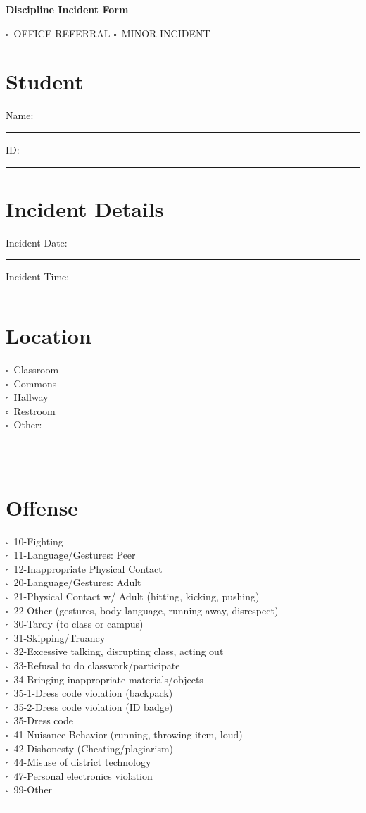 \documentclass[12pt]{article}
\def\sq{$\square$\ }
\begin{document}
\begin{center}
    \textbf{Discipline Incident Form}
\end{center}

\sq OFFICE REFERRAL \hspace{2em} \sq MINOR INCIDENT

\section*{Student}

Name: \rule{6cm}{0.15mm} \hfill ID: \rule{4cm}{0.15mm}

\section*{Incident Details}

Incident Date: \rule{4cm}{0.15mm} \hfill Incident Time: \rule{4cm}{0.15mm}

\section*{Location}

\sq Classroom\\
\sq Commons\\
\sq Hallway\\
\sq Restroom\\
\sq Other: \rule{4cm}{0.15mm}\\

\section*{Offense}
\begin{multicols}{2}
\sq 10-Fighting\\
\sq 11-Language/Gestures: Peer\\
\sq 12-Inappropriate Physical Contact\\
\sq 20-Language/Gestures: Adult\\
\sq 21-Physical Contact w/ Adult (hitting, kicking, pushing)\\
\sq 22-Other (gestures, body language, running away, disrespect)\\
\sq 30-Tardy (to class or campus)\\
\sq 31-Skipping/Truancy\\
\sq 32-Excessive talking, disrupting class, acting out\\
\sq 33-Refusal to do classwork/participate\\
\sq 34-Bringing inappropriate materials/objects\\
\sq 35-1-Dress code violation (backpack)\\
\sq 35-2-Dress code violation (ID badge)\\
\sq 35-Dress code\\
\sq 41-Nuisance Behavior (running, throwing item, loud)\\
\sq 42-Dishonesty (Cheating/plagiarism)\\
\sq 44-Misuse of district technology\\
\sq 47-Personal electronics violation\\
\sq 99-Other \rule{4cm}{0.15mm}\\
\end{multicols}
\end{document}
